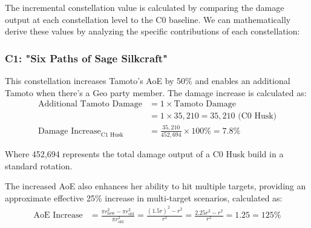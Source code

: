 \documentclass[12pt,a4paper]{article}
\begin{document}
\begin{table}[h]
\centering
{}
\caption{Relative value of constellations by playstyle/role (5★ = highest value)}
\label{tab:constellation_value_by_role}
\end{table}


The incremental constellation value is calculated by comparing the damage output at each constellation level to the C0 baseline. We can mathematically derive these values by analyzing the specific contributions of each constellation:

\subsubsection{C1: "Six Paths of Sage Silkcraft"}
This constellation increases Tamoto's AoE by 50\% and enables an additional Tamoto when there's a Geo party member. The damage increase is calculated as:
\begin{align}
\text{Additional Tamoto Damage} &= 1 \times \text{Tamoto Damage} \\
&= 1 \times 35,210 = 35,210 \text{ (C0 Husk)} \\
\text{Damage Increase}_{\text{C1 Husk}} &= \frac{35,210}{452,694} \times 100\% = 7.8\%
\end{align}

Where 452,694 represents the total damage output of a C0 Husk build in a standard rotation.

The increased AoE also enhances her ability to hit multiple targets, providing an approximate effective 25\% increase in multi-target scenarios, calculated as:
\begin{align}
\text{AoE Increase} &= \frac{\pi r_{\text{new}}^2 - \pi r_{\text{old}}^2}{\pi r_{\text{old}}^2} = \frac{(1.5r)^2 - r^2}{r^2} = \frac{2.25r^2 - r^2}{r^2} = 1.25 = 125\%
\end{align}
\end{document}
